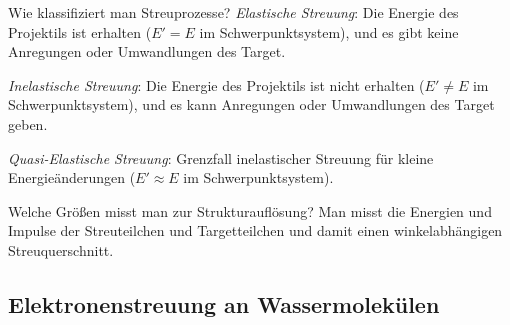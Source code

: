 \begin{fquestion}{Wie klassifiziert man Streuprozesse?}
    \emph{Elastische Streuung}: Die Energie des Projektils ist erhalten ($E' = E$ im Schwerpunktsystem), und es gibt keine Anregungen oder Umwandlungen des Target.
    
    \emph{Inelastische Streuung}: Die Energie des Projektils ist nicht erhalten ($E' \neq E$ im Schwerpunktsystem), und es kann Anregungen oder Umwandlungen des Target geben.
    
    \emph{Quasi-Elastische Streuung}: Grenzfall inelastischer Streuung für kleine Energieänderungen ($E' \approx E$ im Schwerpunktsystem).
\end{fquestion}

\begin{fquestion}{Welche Größen misst man zur Strukturauflösung?}
    Man misst die Energien und Impulse der Streuteilchen und Targetteilchen und damit einen winkelabhängigen Streuquerschnitt.
\end{fquestion}

\subsection{Elektronenstreuung an Wassermolekülen}


